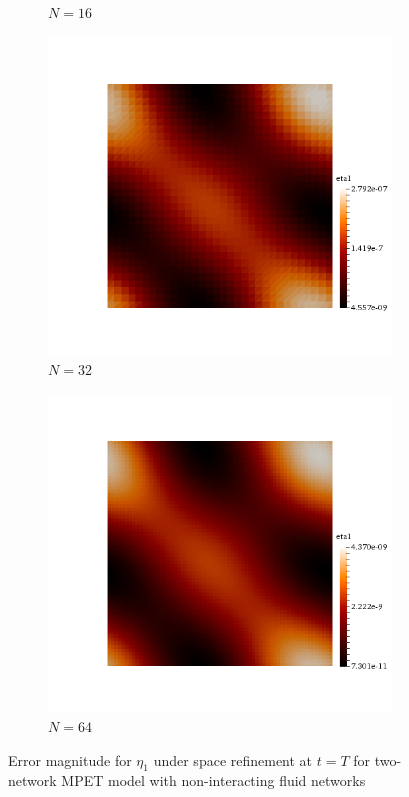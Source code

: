 \begin{figure}[h!]
\begin{subfigure}[b]{0.24\textwidth}
    \caption{$N=16$}
  \end{subfigure}
  \begin{subfigure}[b]{0.24\textwidth}
    \includegraphics[width=\textwidth,height=\textheight,keepaspectratio,height=\textheight,keepaspectratio]{figures/2_mpet/no_transfer/space/eta1_32.png}
    \caption{$N=32$}
  \end{subfigure}
  \begin{subfigure}[b]{0.24\textwidth}
    \includegraphics[width=\textwidth,height=\textheight,keepaspectratio,height=\textheight,keepaspectratio]{figures/2_mpet/no_transfer/space/eta1_64.png}
    \caption{$N=64$}
  \end{subfigure}
  \caption{Error magnitude for $\eta_1$ under space refinement at $t=T$ for two-network MPET model with non-interacting fluid networks} \label{fig:bb_no_transfer_eta1}
\end{figure}

